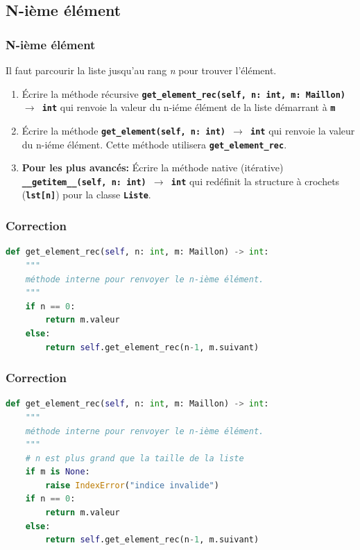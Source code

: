 \documentclass[svgnames,11pt]{beamer}
\begin{document}
\subsection{N-ième élément}
\begin{frame}
    \frametitle{N-ième élément}

    Il faut parcourir la liste jusqu'au rang \emph{n} pour trouver l'élément.
    \begin{activite}
        \begin{enumerate}
            \item Écrire la méthode récursive \textbf{\texttt{get\_element\_rec(self, n: int, m: Maillon) $\rightarrow$ int}} qui renvoie la valeur du n-iéme élément de la liste démarrant à \textbf{\texttt{m}}
            \item Écrire la méthode \textbf{\texttt{get\_element(self, n: int) $\rightarrow$ int}} qui renvoie la valeur du n-iéme élément. Cette méthode utilisera \textbf{\texttt{get\_element\_rec}}.
            \item \textbf{Pour les plus avancés:} Écrire la méthode native (itérative) \textbf{\texttt{\_\_getitem\_\_(self, n: int) $\rightarrow$ int}} qui redéfinit la structure à crochets (\textbf{\texttt{lst[n]}}) pour la classe \textbf{\texttt{Liste}}.
        \end{enumerate}
    \end{activite}

\end{frame}
\begin{frame}[fragile]
    \frametitle{Correction}

    \begin{center}
    \begin{lstlisting}[language=Python , basicstyle=\ttfamily\small, xleftmargin=0em, xrightmargin=0em]
def get_element_rec(self, n: int, m: Maillon) -> int:
    """
    méthode interne pour renvoyer le n-ième élément.
    """
    if n == 0:
        return m.valeur
    else:
        return self.get_element_rec(n-1, m.suivant)
\end{lstlisting}
    \end{center}

\end{frame}
\begin{frame}[fragile]
    \frametitle{Correction}

    \begin{center}
    \begin{lstlisting}[language=Python , basicstyle=\ttfamily\small, xleftmargin=0em, xrightmargin=0em]
def get_element_rec(self, n: int, m: Maillon) -> int:
    """
    méthode interne pour renvoyer le n-ième élément.
    """
    # n est plus grand que la taille de la liste
    if m is None:
        raise IndexError("indice invalide")
    if n == 0:
        return m.valeur
    else:
        return self.get_element_rec(n-1, m.suivant)
\end{lstlisting}
    \label{CODE}
    \end{center}

\end{frame}
\end{document}
